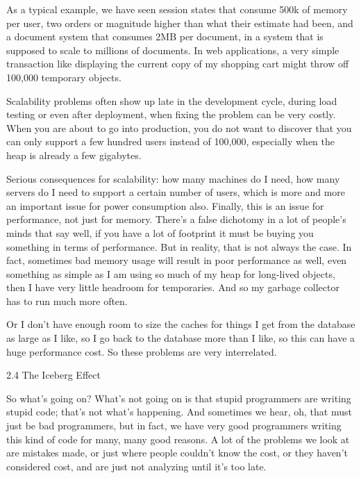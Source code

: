As a typical example, we have seen session states that consume 500k of memory per user, two orders or magnitude higher than what their estimate had been, and a document system that consumes 2MB per document, in a system that is supposed to scale to millions  of documents. In web applications, a very simple transaction like displaying the current copy of my shopping cart might throw off 100,000 temporary  objects.

Scalability problems often show up late in the development cycle, during load testing or even after deployment, when fixing the problem can be very costly. When you are about to go into production, you do not want to discover that you can only support a few hundred users instead of 100,000, especially when the heap is already a few gigabytes. 

Serious consequences for scalability:  how many machines do I need, how many servers do I need to support a certain number of users, which is more and more an important issue for power consumption also.  
Finally, this is an issue for performance, not just for memory. There's a false dichotomy in a lot of people's minds that say well, if you have a lot of footprint it must be buying you something in terms of performance. But in reality, that is not always the case. In fact, sometimes bad memory usage will result in poor performance as well, even something as simple as I am using so much of my heap for long-lived objects, then I have very little headroom for temporaries.  And so my garbage collector has to run much more often. 

Or I don't have enough room to size the caches for things I get from the database as large as I like, so I go back to the database more than I like, so this can have a huge performance cost. So these problems are very interrelated.

2.4 The Iceberg Effect

So what's going on? What's not going on is that stupid programmers are writing stupid code; that's not what's happening.  And sometimes we hear, oh, that must just be bad programmers, but in fact, we have very good programmers writing this kind of code for many, many good reasons. A lot of the problems we look at are mistakes made, or just where people couldn't know the cost, or they haven't considered cost, and are just not analyzing until it's too late. 

